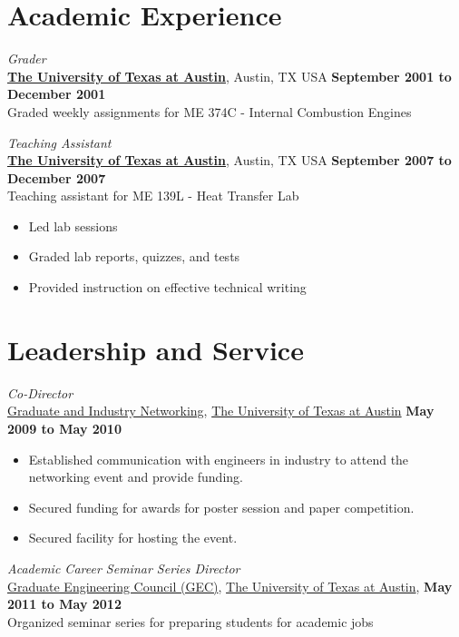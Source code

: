 \documentclass[centered]{res}
\begin{document}
\begin{resume}
\section{Academic Experience}
\label{sec:teaching}

\textit{Grader} \\
\href{http://www.utexas.edu/}{\textbf{The University of Texas at
    Austin}}, Austin, TX USA
\hfill \textbf{September 2001 to December 2001} \\
Graded weekly assignments for ME 374C - Internal Combustion Engines 

\textit{Teaching Assistant} \\
\href{http://www.utexas.edu/}{\textbf{The University of Texas at
    Austin}}, Austin, TX USA
\hfill \textbf{September 2007 to December 2007} \\
Teaching assistant for ME 139L - Heat Transfer Lab
\begin{itemize} \itemsep -2pt
\item Led lab sessions 
\item Graded lab reports, quizzes, and tests
\item Provided instruction on effective technical writing
\end{itemize}

\section{Leadership and Service}
\textit{Co-Director} \\
\href{http://gain.engr.utexas.edu/}{Graduate and Industry Networking},
\href{http://www.utexas.edu}{The University of Texas at Austin}
\hfill \textbf{May 2009 to May 2010}
\begin{itemize} \itemsep -2pt %
\item Established communication with engineers in industry to attend the networking event and provide funding.
\item Secured funding for awards for poster session and paper competition.
\item Secured facility for hosting the event.  
\end{itemize}

\textit{Academic Career Seminar Series Director} \\
\href{http://sites.google.com/site/utexasgecouncil/}{Graduate Engineering Council (GEC)},
\href{http://www.utexas.edu}{The University of Texas at Austin},
\hfill \textbf{May 2011 to May 2012} \\ 
Organized seminar series for preparing students for academic jobs


\end{resume}
\end{document}
